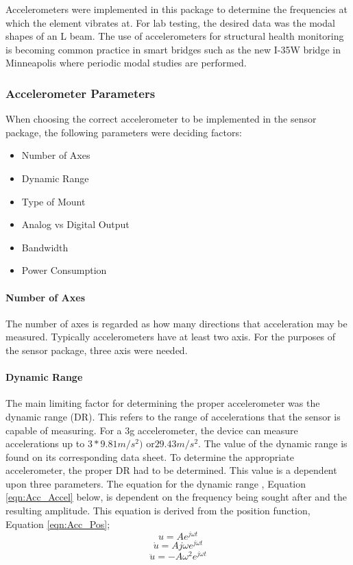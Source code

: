 \indent Accelerometers were implemented in this package to determine the frequencies at which the element vibrates at. For lab testing, the desired data was the modal shapes of an L beam. The use of accelerometers for structural health monitoring is becoming common practice in smart bridges such as the new I-35W bridge in Minneapolis where periodic modal studies are performed\cite{Kistler}.

\subsubsection{Accelerometer Parameters}
\indent When choosing the correct accelerometer to be implemented in the sensor package, the following parameters were deciding factors:
\begin{itemize}
\item Number of Axes
\item Dynamic Range
\item Type of Mount
\item Analog vs Digital Output
\item Bandwidth
\item Power Consumption
\end{itemize}

\paragraph{Number of Axes}
\indent The number of axes is regarded as how many directions that acceleration may be measured. Typically accelerometers have at least two axis. For the purposes of the sensor package, three axis were needed.
\paragraph{Dynamic Range}
\indent The main limiting factor for determining the proper accelerometer was the dynamic range (DR).  This refers to the range of accelerations that the sensor is capable of measuring. For a 3g accelerometer, the device can measure accelerations up to $3*9.81m/s^{2})$ or$ 29.43 m/s^{2}$.  The value of the dynamic range is found on its corresponding data sheet.  To determine the appropriate accelerometer, the proper DR had to be determined.  This value is a dependent upon three parameters.  The equation for the dynamic range , Equation \ref{eqn:Acc_Accel} below, is dependent on the frequency being sought after and the resulting amplitude.  This equation is derived from the position function, Equation \ref{eqn:Acc_Pos};  
\begin{equation}
u = Ae^{j\omega t}
\label{eqn:Acc_Pos}
\end{equation}
\begin{equation}
\dot{u} = Aj\omega e^{j\omega t}
\label{eqn:Acc_Vel}
\end{equation}
\begin{equation}
\ddot{u} = -A\omega^{2}e^{j\omega t}
\label{eqn:Acc_Accel}
\end{equation}

